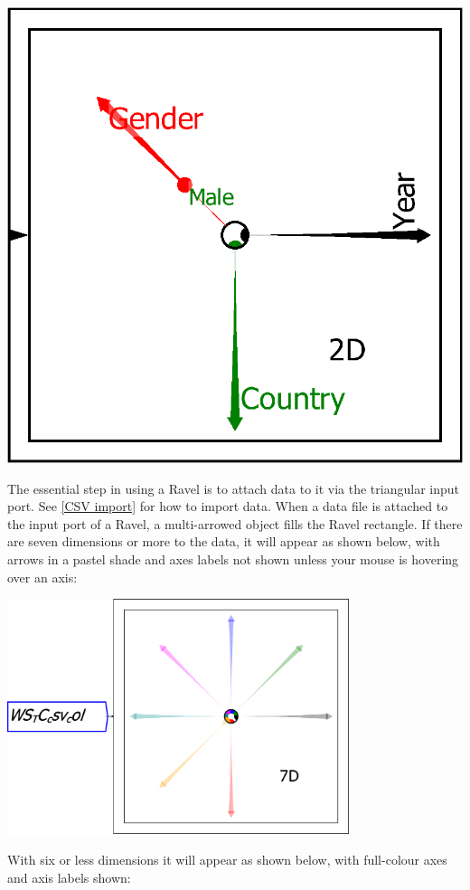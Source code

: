 \includegraphics{images/RavelBlank}

The essential step in using a Ravel is to attach data to it via the
triangular input port. See \ref{CSV import} for how to import data.
When a data file is attached to the input port of a Ravel, a multi-arrowed
object fills the Ravel rectangle. If there are seven dimensions or
more to the data, it will appear as shown below, with arrows in a
pastel shade and axes labels not shown unless your mouse is hovering
over an axis:

\includegraphics[width=10cm]{images/RavelDataImporting01}

With six or less dimensions it will appear as shown below, with full-colour
axes and axis labels shown:

